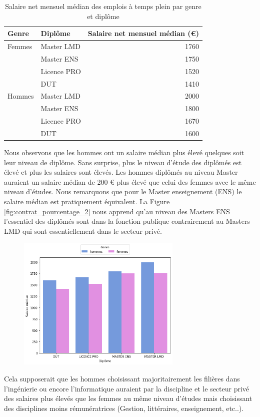 \documentclass[12pt, a4paper, titlepage, table]{article}
\begin{document}
	\begin{table}[H]
		\centering
		\begin{tabular}{llr}
			\toprule
			\textbf{Genre} & \textbf{Diplôme} & \textbf{{Salaire net mensuel médian (€)}} \\
			\midrule
			Femmes & Master LMD & 1760 \\
			& Master ENS & 1750 \\
			& Licence PRO & 1520 \\
			& DUT & 1410 \\
			\midrule
			Hommes & Master LMD & 2000 \\
			& Master ENS & 1800 \\
			& Licence PRO & 1670 \\
			& DUT & 1600 \\
			\bottomrule
		\end{tabular}
		\caption{Salaire net mensuel médian des emplois à temps plein par genre et diplôme}
		\label{tab:salaire_median_genre}
	\end{table}
	
	Nous observons que les hommes ont un salaire médian plus élevé quelques soit leur niveau de diplôme.
	Sans surprise, plus le niveau d'étude des diplômés est élevé et plus les salaires sont élevés.
	Les hommes diplômés au niveau Master auraient un salaire médian de 200 € plus élevé que celui des femmes avec le même niveau d'études.
	Nous remarquons que pour le Master enseignement (ENS) le salaire médian est pratiquement équivalent.  
	La Figure \ref{fig:contrat_pourcentage_2} nous apprend qu'au niveau des Masters ENS l'essentiel des diplômés sont dans la fonction publique contrairement au Masters LMD qui sont essentiellement dans le secteur privé.
		
	\begin{figure}[H]
		\centering
		\includegraphics[width=0.7\textwidth]{../graphs/salaires_medians_genre.png}
		\label{fig:salaire_median_genre}
	\end{figure}
	Cela supposerait que les hommes choisissant majoritairement les filières dans l’ingénierie ou encore l'informatique auraient par la discipline et le secteur privé des salaires plus élevés que les femmes au même niveau d'études mais choisissant des disciplines moins rémunératrices (Gestion, littéraires, enseignement, etc..). 
\end{document}
